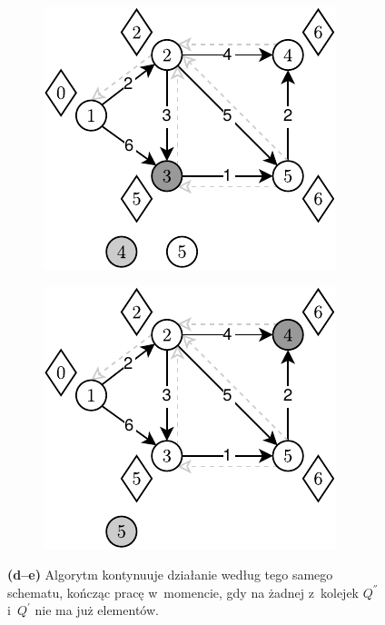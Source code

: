 \begin{figure}[!htbp]
	\ContinuedFloat
	\centering
	\begin{subfigure}[b]{0.3\textwidth}
		\includegraphics[width=\textwidth]{Chapter_III/GRAPH-GROWTH-2Q-Example/d.pdf}
		\caption{}
	\end{subfigure}
	\qquad	\qquad
	\begin{subfigure}[b]{0.3\textwidth}
		\includegraphics[width=\textwidth]{Chapter_III/GRAPH-GROWTH-2Q-Example/e.pdf}
		\caption{}
	\end{subfigure}
	\caption{ \textbf{(d--e)} Algorytm kontynuuje działanie według tego samego schematu, kończąc pracę w~momencie, gdy na żadnej z~kolejek $Q^{''}$ i~$Q^{'}$ nie ma już elementów. } \label{fig:exampleDQQ2}
\end{figure}


